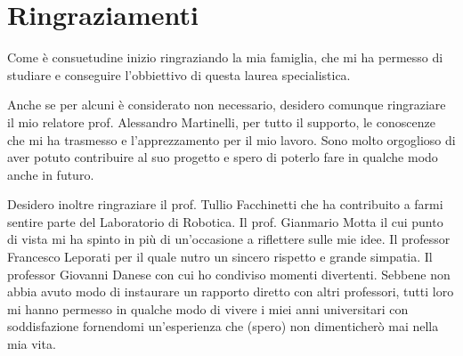 
\chapter*{Ringraziamenti}
Come \`e consuetudine inizio ringraziando la mia famiglia, che mi ha permesso di studiare e conseguire l'obbiettivo di questa laurea specialistica.

Anche se per alcuni \`e considerato non necessario, desidero comunque ringraziare il mio relatore prof. Alessandro Martinelli, per tutto il supporto, le conoscenze che mi ha trasmesso e l'apprezzamento per il mio lavoro. Sono molto orgoglioso di aver potuto contribuire al suo progetto e spero di poterlo fare in qualche modo anche in futuro.

Desidero inoltre ringraziare il prof. Tullio Facchinetti che ha contribuito a farmi sentire parte del Laboratorio di Robotica. 
Il prof. Gianmario Motta il cui punto di vista mi ha spinto in pi\`u di un'occasione a riflettere sulle mie idee.
Il professor Francesco Leporati per il quale nutro un sincero rispetto e grande simpatia.
Il professor Giovanni Danese con cui ho condiviso momenti divertenti.
Sebbene non abbia avuto modo di instaurare un rapporto diretto con altri professori, tutti loro mi hanno permesso in qualche modo di vivere i miei anni universitari con soddisfazione fornendomi un'esperienza che (spero) non dimenticher\`o mai nella mia vita.

